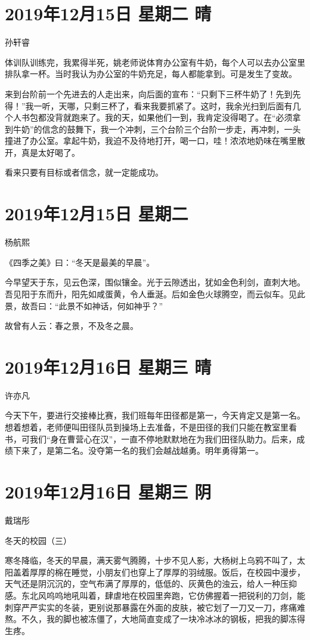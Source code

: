 \section{2019年12月15日 星期二 晴}

孙轩睿

体训队训练完，我累得半死，姚老师说体育办公室有牛奶，每个人可以去办公室里排队拿一杯。当时我认为办公室的牛奶充足，每人都能拿到。可是发生了变故。

来到台阶前一个先进去的人走出来，向后面的宣布：``只剩下三杯牛奶了！先到先得！''我一听，天哪，只剩三杯了，看来我要抓紧了。这时，我余光扫到后面有几个人书包都没背就跑来了。我的天，如果他们一到，我肯定没得喝了。在``必须拿到牛奶''的信念的鼓舞下，我一个冲刺，三个台阶三个台阶一步走，再冲刺，一头撞进了办公室。拿起牛奶，我迫不及待地打开，喝一口，哇！浓浓地奶味在嘴里散开，真是太好喝了。

看来只要有目标或者信念，就一定能成功。

\section{2019年12月15日 星期二}

杨航熙

《四季之美》曰：``冬天是最美的早晨''。

今早望天于东，见云色深，围似镶金。光于云隙透出，犹如金色利剑，直刺大地。吾见阳于东而升，阳先如咸蛋黄，令人垂涎。后如金色火球腾空，而云似车。见此景，故吾曰：``此景不如神话，何如神乎？''

故曾有人云：春之景，不及冬之晨。

\section{2019年12月16日 星期三 晴}

许亦凡

今天下午，要进行交接棒比赛，我们班每年田径都是第一，今天肯定又是第一名。想着想着，老师便叫田径队员到操场上去准备，不是田径的我们只能在教室里看书，可我们``身在曹营心在汉''，一直不停地默默地在为我们田径队助力。后来，成绩下来了，是第二名。没夺第一名的我们会越战越勇。明年勇得第一。

\section{2019年12月16日 星期三 阴}

戴瑞彤

冬天的校园（三）

寒冬降临，冬天的早晨，满天雾气腾腾，十步不见人影，大杨树上乌鸦不叫了，太阳盖着厚厚的棉在睡觉，小朋友们也穿上了厚厚的羽绒服。饭后，在校园中漫步，天气还是阴沉沉的，空气布满了厚厚的，低低的、灰黄色的浊云，给人一种压抑感。东北风呜呜地吼叫着，肆虐地在校园里奔跑，它仿佛握着一把锐利的刀剑，能刺穿严严实实的冬装，更别说那暴露在外面的皮肤，被它划了一刀又一刀，疼痛难熬。不久，我的脚也被冻僵了，大地简直变成了一块冷冰冰的钢板，把我的脚冻得生疼。

